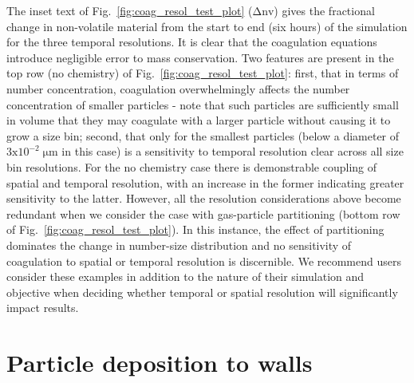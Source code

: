 \documentclass[gmd, manuscript]{copernicus}
\begin{document}
The inset text of Fig.~\ref{fig:coag_resol_test_plot} ($\mathrm{\Delta nv}$) gives the fractional change in non-volatile material from the start to end (six hours) of the simulation for the three temporal resolutions.  It is clear that the coagulation equations introduce negligible error to mass conservation.  Two features are present in the top row (no chemistry) of Fig.~\ref{fig:coag_resol_test_plot}: first, that in terms of number concentration, coagulation overwhelmingly affects the number concentration of smaller particles - note that such particles are sufficiently small in volume that they may coagulate with a larger particle without causing it to grow a size bin; second, that only for the smallest particles (below a diameter of $\mathrm{3x10^{-2}\; \mu m}$ in this case) is a sensitivity to temporal resolution clear across all size bin resolutions.  For the no chemistry case there is demonstrable coupling of spatial and temporal resolution, with an increase in the former indicating greater sensitivity to the latter.  However, all the resolution considerations above become redundant when we consider the case with gas-particle partitioning (bottom row of Fig.~\ref{fig:coag_resol_test_plot}).  In this instance, the effect of partitioning dominates the change in number-size distribution and no sensitivity of coagulation to spatial or temporal resolution is discernible.  We recommend users consider these examples in addition to the nature of their simulation and objective when deciding whether temporal or spatial resolution will significantly impact results.



\section{Particle deposition to walls}\label{sec:part2wall}
\end{document}
